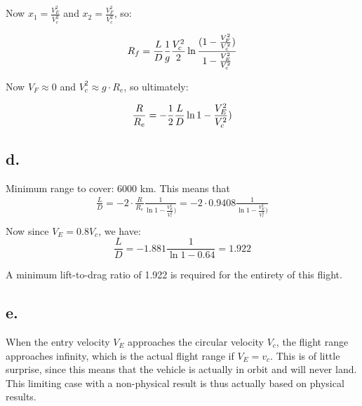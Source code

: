 Now $x_1 = \frac{V_E^2}{V_c^2}$ and $x_2 = \frac{V_F^2}{V_c^2}$, so:

\begin{equation}
    R_f =  \frac{L}{D} \frac{1}{g}  \frac{V_c^2}{2} \ln{\frac{(1-\frac{V_F^2}{V_c^2})}{1-\frac{V_E^2}{V_c^2}}} \\
\end{equation}

Now $V_F \approx 0$ and $V_c^2 \approx g\cdot R_e$, so ultimately:

\begin{equation}
    \frac{R}{R_e} =  -\frac{1}{2}\frac{L}{D} \ln{1-\frac{V_E^2}{V_c^2})} \\
\end{equation}


\subsection*{d.}
Minimum range to cover: 6000 km. This means that 
\begin{equation}
\begin{split}
      \frac{L}{D} = -2 \cdot \frac{R}{R_e} \frac{1}{ \ln{1-\frac{V_E^2}{V_c^2})}} = -2 \cdot 0.9408 \frac{1}{ \ln{1-\frac{V_E^2}{V_c^2})}} \\    
\end{split}
\end{equation}
Now since $V_E = 0.8 V_c$, we have:
\begin{equation}
   \frac{L}{D} = -1.881 \frac{1}{ \ln{1-0.64}}  = 1.922
\end{equation}

A minimum lift-to-drag ratio of 1.922 is required for the entirety of this flight.

\subsection*{e.}
When the entry velocity $V_E$ approaches the circular velocity $V_c$, the flight range approaches infinity, which is the actual flight range if $V_E = v_c$. This is of little surprise, since this means that the vehicle is actually in orbit and will never land. This limiting case with a non-physical result is thus actually based on physical results.